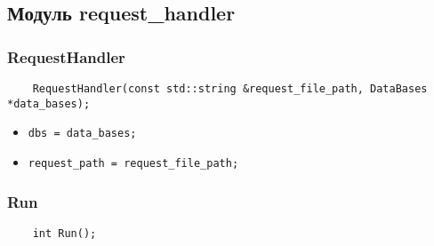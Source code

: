 \subsection{Модуль request\_handler}

\subsubsection{RequestHandler}

\begin{lstlisting}
    RequestHandler(const std::string &request_file_path, DataBases *data_bases);
\end{lstlisting}

\begin{itemize}
    \item \verb|dbs = data_bases;|
    \item \verb|request_path = request_file_path;|
\end{itemize}

\subsubsection{Run}

\begin{lstlisting}
    int Run();
\end{lstlisting}

